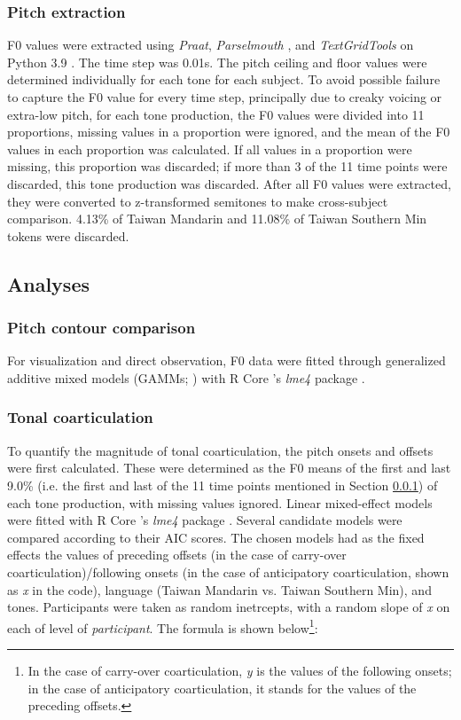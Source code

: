 \subsubsection{Pitch extraction}\label{section:PitchExtraction}
F0 values were extracted using \textit{Praat}, \textit{Parselmouth} \citep{Jadouletal2018}, and \textit{TextGridTools} \citep{BuschmeierWlodarczak2013} on Python 3.9 \citep{vanRossumDrake2009}. The time step was 0.01s. The pitch ceiling and floor values were determined individually for each tone for each subject. To avoid possible failure to capture the F0 value for every time step, principally due to creaky voicing or extra-low pitch, for each tone production, the F0 values were divided into 11 proportions, missing values in a proportion were ignored, and the mean of the F0 values in each proportion was calculated. If all values in a proportion were missing, this proportion was discarded; if more than 3 of the 11 time points were discarded, this tone production was discarded. After all F0 values were extracted, they were converted to z-transformed semitones to make cross-subject comparison. 4.13\% of Taiwan Mandarin and 11.08\% of Taiwan Southern Min tokens were discarded.

\subsection{Analyses}
\subsubsection{Pitch contour comparison}
For visualization and direct observation, F0 data were fitted through generalized additive mixed models (GAMMs; \citealp{Wieling2018}) with R Core \citep{RCoreTeam2019}’s \textit{lme4} package \citep{Batesetal2015}.

\subsubsection{Tonal coarticulation}
To quantify the magnitude of tonal coarticulation, the pitch onsets and offsets were first calculated. These were determined as the F0 means of the first and last 9.0\% (i.e. the first and last of the 11 time points mentioned in Section \ref{section:PitchExtraction}) of each tone production, with missing values ignored. Linear mixed-effect models were fitted with R Core \citep{RCoreTeam2019}’s \textit{lme4} package \citep{Batesetal2015}. Several candidate models were compared according to their AIC scores. The chosen models had as the fixed effects the values of preceding offsets (in the case of carry-over coarticulation)/following onsets (in the case of anticipatory coarticulation, shown as \textit{x} in the code), language (Taiwan Mandarin vs. Taiwan Southern Min), and tones. Participants were taken as random inetrcepts, with a random slope of \textit{x} on each of level of \textit{participant}. The formula is shown below\footnote{In the case of carry-over coarticulation, \textit{y} is the values of the following onsets; in the case of anticipatory coarticulation, it stands for the values of the preceding offsets.}:

